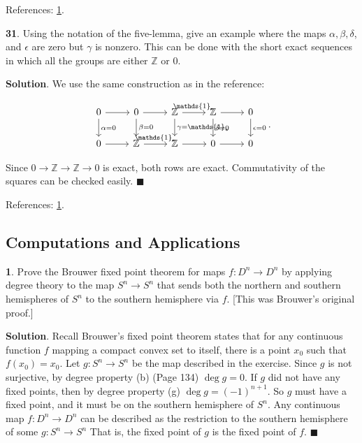 \documentclass{article}
\newcommand{\Z}{\mathbb{Z}}
\newcommand{\identity}{\mathds{1}}
\begin{document}
References: \href{http://web.math.ku.dk/~moller/blok1_05/AT-ex.pdf}{1}.
\bigskip
\bigskip

\textbf{31}. Using the notation of the five-lemma, give an example where the maps $\alpha, \beta, \delta$, and $\epsilon$ are zero but $\gamma$ is nonzero. This can be done with the short exact sequences in which all the groups are either $\Z$ or 0.
\medskip

\textbf{Solution}. We use the same construction as in the reference:

\[\begin{tikzcd}
0 \arrow{r}\arrow{d}{\alpha = 0} & 0 \arrow{r}\arrow{d}{\beta = 0} & \Z \arrow{r}{\identity_{\ast}}\arrow{d}{\gamma = \identity_{\ast}} & \Z \arrow{r}\arrow{d}{\delta = 0} & 0 \arrow{d}{\epsilon = 0}\\
0 \arrow{r} & \Z \arrow{r}{\identity_{\ast}} & \Z \arrow{r} & 0 \arrow{r} & 0
\end{tikzcd}.\]
\medskip

Since $0\to \Z\to \Z\to 0$ is exact, both rows are exact. Commutativity of the squares can be checked easily. $\blacksquare$
\medskip

References: \href{https://cemulate.github.io/solutions_hatcher/e2-1-31.html}{1}.
\bigskip
\bigskip

\subsection{Computations and Applications}

\tab\textbf{1}. Prove the Brouwer fixed point theorem for maps $f:D^{n}\to D^{n}$ by applying degree theory to the map $S^{n}\to S^{n}$ that sends both the northern and southern hemispheres of $S^{n}$ to the southern hemisphere via $f$. [This was Brouwer's original proof.]
\medskip

\textbf{Solution}. Recall Brouwer's fixed point theorem states that for any continuous function $f$ mapping a compact convex set to itself, there is a point $x_{0}$ such that $f(x_{0}) = x_{0}$. Let $g: S^{n}\to S^{n}$ be the map described in the exercise. Since $g$ is not surjective, by degree property (b) (Page 134) $\deg g = 0$. If $g$ did not have any fixed points, then by degree property (g) $\deg g = (-1)^{n+1}$. So $g$ must have a fixed point, and it must be on the southern hemisphere of $S^{n}$. Any continuous map $f:D^{n}\to D^{n}$ can be described as the restriction to the southern hemisphere of some $g: S^{n}\to S^{n}$  That is, the fixed point of $g$ is the fixed point of $f$. $\blacksquare$
\medskip
\end{document}
